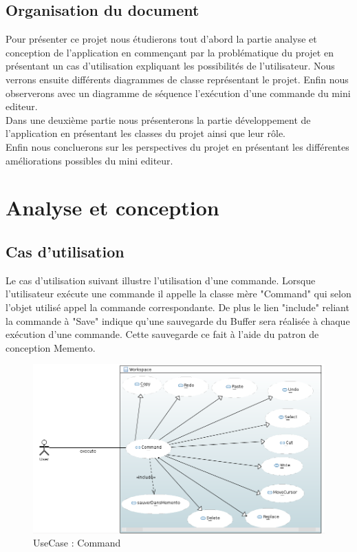 \documentclass[11pt,a4paper,oldfontcommands]{memoir}
\begin{document}
\section{Organisation du document}
Pour présenter ce projet nous étudierons tout d'abord la partie analyse et conception de l'application en commençant par la problématique du projet en présentant un cas d'utilisation expliquant les possibilités de l'utilisateur. Nous verrons ensuite différents diagrammes de classe représentant le projet. Enfin nous observerons avec un diagramme de séquence l'exécution d'une commande du mini editeur.\\
Dans une deuxième partie nous présenterons la partie développement de l'application en présentant les classes du projet ainsi que leur rôle.\\
Enfin nous concluerons sur les perspectives du projet en présentant les différentes améliorations possibles du mini editeur.

\chapter{Analyse et conception}
\section{Cas d'utilisation}
Le cas d'utilisation suivant illustre l'utilisation d'une commande. Lorsque l'utilisateur exécute une commande il appelle la classe mère "Command" qui selon l'objet utilisé appel la commande correspondante. De plus le lien "include" reliant la commande à "Save" indique qu'une sauvegarde du Buffer sera réalisée à chaque exécution d'une commande. Cette sauvegarde ce fait à l'aide du patron de conception Memento. \\
\begin{figure}[!ht]
\centering 
\includegraphics[width=13cm]{useCaseCommand.png}
\caption{UseCase : Command}
\label{figure1}
\end{figure}
\end{document}
